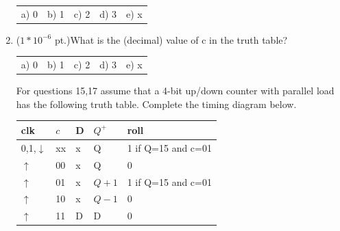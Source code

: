 \documentclass{article}
\begin{document}
\begin{enumerate}
\begin{tabular}{p{0.6in} p{0.6in} p{0.6in} p{0.6in} l}
a) 0 & b) 1 & c) 2 & d) 3 & e) x  
\end{tabular}

\item {($1*10^{-6}$ pt.)}What is the (decimal) value of c in the truth table?

\begin{tabular}{p{0.6in} p{0.6in} p{0.6in} p{0.6in} l}
a) 0 & b) 1 & c) 2 & d) 3 & e) x  
\end{tabular}

\pagebreak
For questions 15,17 assume that a 4-bit up/down counter with parallel load
has the following truth table.   Complete the timing diagram below.

\begin{tabular}{l|l|l||l|l}
clk             & $c$		& D & $Q^+$ & roll  \\ \hline
0,1,$\downarrow$& xx            & x & Q     & 1 if Q=15 and c=01 \\ \hline
$\uparrow$      & 00            & x & Q     & 0			 \\  \hline
$\uparrow$      & 01            & x & $Q+1$ & 1 if Q=15 and c=01 \\ \hline
$\uparrow$      & 10            & x & $Q-1$ & 0			\\  \hline
$\uparrow$      & 11            & D & D     & 0			 \\
\end{tabular}


\end{enumerate}
\end{document}
